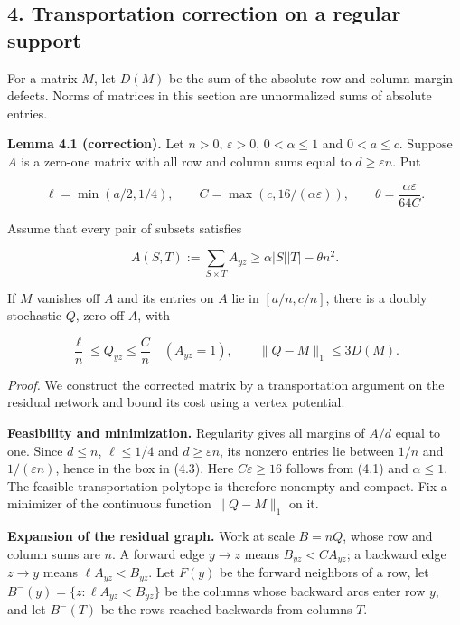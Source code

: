\documentclass[english,11pt,a4paper]{article}
\newcounter{none}
\begin{document}
\subsection{4. Transportation correction on a regular support}\label{transportation-correction-on-a-regular-support}

For a matrix \(M\), let \(D(M)\) be the sum of the absolute row and column margin defects. Norms of matrices in this section are unnormalized sums of absolute entries.

\textbf{Lemma 4.1 (correction).} Let \(n>0\), \(\varepsilon>0\), \(0<\alpha\le1\) and \(0<a\le c\). Suppose \(A\) is a zero-one matrix with all row and column sums equal to \(d\ge\varepsilon n\). Put

\nopagebreak[4]
\[\ell=\min(a/2,1/4),\qquad C=\max(c,16/(\alpha\varepsilon)),
\qquad\theta=\frac{\alpha\varepsilon}{64C}.\tag{4.1}\]

Assume that every pair of subsets satisfies

\nopagebreak[4]
\[A(S,T):=\sum_{S\times T}A_{yz}\ge\alpha|S||T|-\theta n^2.\tag{4.2}\]

If \(M\) vanishes off \(A\) and its entries on \(A\) lie in \([a/n,c/n]\), there is a doubly stochastic \(Q\), zero off \(A\), with

\nopagebreak[4]
\[\frac\ell n\le Q_{yz}\le\frac Cn\quad(A_{yz}=1),\qquad
\|Q-M\|_1\le3D(M).\tag{4.3}\]

\emph{Proof.} We construct the corrected matrix by a transportation argument on the residual network and bound its cost using a vertex potential.

\textbf{Feasibility and minimization.} Regularity gives all margins of \(A/d\) equal to one. Since \(d\le n\), \(\ell\le1/4\) and \(d\ge\varepsilon n\), its nonzero entries lie between \(1/n\) and \(1/(\varepsilon n)\), hence in the box in (4.3). Here \(C\varepsilon\ge16\) follows from (4.1) and \(\alpha\le1\). The feasible transportation polytope is therefore nonempty and compact. Fix a minimizer of the continuous function \(\|Q-M\|_1\) on it.

\textbf{Expansion of the residual graph.} Work at scale \(B=nQ\), whose row and column sums are \(n\). A forward edge \(y\to z\) means \(B_{yz}<CA_{yz}\); a backward edge \(z\to y\) means \(\ell A_{yz}<B_{yz}\). Let \(F(y)\) be the forward neighbors of a row, let \(B^-(y)=\{z:\ell A_{yz}<B_{yz}\}\) be the columns whose backward arcs enter row \(y\), and let \(B^-(T)\) be the rows reached backwards from columns \(T\).
\end{document}
